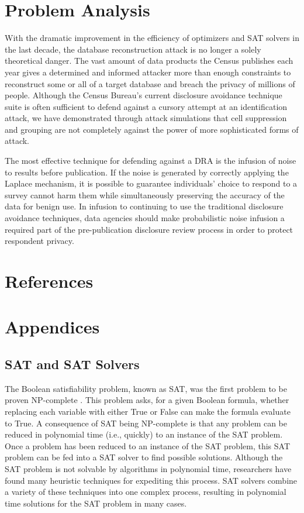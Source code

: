\documentclass[5p,times,11pt]{elsarticle}
\begin{document}
\section{Problem Analysis}

With the dramatic improvement in the efficiency of optimizers and SAT solvers in the last decade, the database reconstruction attack is no longer a solely theoretical danger. The vast amount of data products the Census publishes each year gives a determined and informed attacker more than enough constraints to reconstruct some or all of a target database and breach the privacy of millions of people. Although the Census Bureau's current disclosure avoidance technique suite is often sufficient to defend against a cursory attempt at an identification attack, we have demonstrated through attack simulations that cell suppression and grouping are not completely against the power of more sophisticated forms of attack.

The most effective technique for defending against a DRA is the infusion of noise to results before publication. If the noise is generated by correctly applying the Laplace mechanism, it is possible to guarantee individuals' choice to respond to a survey cannot harm them while simultaneously preserving the accuracy of the data for benign use. In infusion to continuing to use the traditional disclosure avoidance techniques, data agencies should make probabilistic noise infusion a required part of the pre-publication disclosure review process in order to protect respondent privacy.

\section{References}





\section{Appendices}

\subsection{SAT and SAT Solvers}

The Boolean satisfiability problem, known as SAT, was the first problem to be proven NP-complete \cite{cooklevin}. This problem asks, for a given Boolean formula, whether replacing each variable with either True or False can make the formula evaluate to True.   A consequence of SAT being NP-complete is that any problem can be reduced in polynomial time (i.e., quickly) to an instance of the SAT problem. Once a problem has been reduced to an instance of the SAT problem, this SAT problem can be fed into a SAT solver to find possible solutions. Although the SAT problem is not solvable by algorithms in polynomial time, researchers have found many heuristic techniques for expediting this process. SAT solvers combine a variety of these techniques into one complex process, resulting in polynomial time solutions for the SAT problem in many cases.
\end{document}
